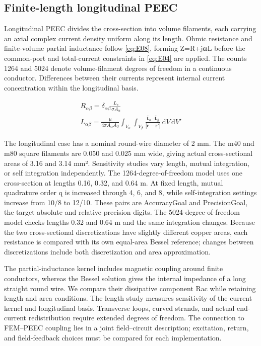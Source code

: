 \hypertarget{02.peec_method.heading}{}
\subsection{Finite-length longitudinal PEEC}

\hypertarget{02.peec_method.p1}{}
Longitudinal PEEC divides the cross-section into volume filaments, each carrying an axial complex current density uniform along its length. Ohmic resistance and finite-volume partial inductance follow \eqref{eq:E08}, forming Z=R+jωL before the common-port and total-current constraints in \eqref{eq:E04} are applied. The counts 1264 and 5024 denote volume-filament degrees of freedom in a continuous conductor. Differences between their currents represent internal current concentration within the longitudinal basis.

\hypertarget{02.equation.E08}{}
\hypertarget{E08}{}
\begin{equation}
\begin{gathered}
R_{\alpha\beta}=\delta_{\alpha\beta}\frac{L_z}{\sigma A_\alpha} \\
L_{\alpha\beta}=\frac{\mu}{4\pi A_\alpha A_\beta}\int_{V_\alpha}\int_{V_\beta}\frac{\hat{\mathbf t}_\alpha\cdot\hat{\mathbf t}_\beta}{|\mathbf r-\mathbf r'|}\,\mathrm dV\,\mathrm dV'
\end{gathered}
\tag{5}\label{eq:E08}
\end{equation}

\hypertarget{02.peec_method.p2}{}
The longitudinal case has a nominal round-wire diameter of 2 mm. The m40 and m80 square filaments are 0.050 and 0.025 mm wide, giving actual cross-sectional areas of 3.16 and 3.14 mm². Sensitivity studies vary length, mutual integration, or self integration independently. The 1264-degree-of-freedom model uses one cross-section at lengths 0.16, 0.32, and 0.64 m. At fixed length, mutual quadrature order q is increased through 4, 6, and 8, while self-integration settings increase from 10/8 to 12/10. These pairs are AccuracyGoal and PrecisionGoal, the target absolute and relative precision digits. The 5024-degree-of-freedom model checks lengths 0.32 and 0.64 m and the same integration changes. Because the two cross-sectional discretizations have slightly different copper areas, each resistance is compared with its own equal-area Bessel reference; changes between discretizations include both discretization and area approximation.

\hypertarget{02.peec_method.p3}{}
The partial-inductance kernel includes magnetic coupling around finite conductors, whereas the Bessel solution gives the internal impedance of a long straight round wire. We compare their dissipative component Rac while retaining length and area conditions. The length study measures sensitivity of the current kernel and longitudinal basis. Transverse loops, curved strands, and actual end-current redistribution require extended degrees of freedom. The connection to FEM–PEEC coupling \cite{P03} lies in a joint field–circuit description; excitation, return, and field-feedback choices must be compared for each implementation.
